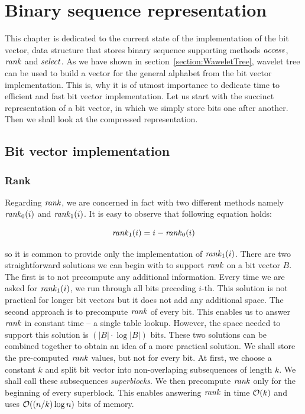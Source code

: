 \chapter{Binary sequence representation}
\label{kap:kap2}

This chapter is dedicated to the current state of the implementation of the bit vector, data
structure that stores binary sequence supporting methods $\mathit{access}$, $\mathit{rank}$ and $\mathit{select}$. As we have
shown in section~\ref{section:WaweletTree}, wavelet tree can be used to build a vector
for the general alphabet from the bit vector implementation. This is, why it is of utmost
importance to dedicate time to efficient and fast bit vector implementation. Let us start with
the succinct representation of a bit vector, in which we simply store bits one after another.
Then we shall look at the compressed representation.

\section{Bit vector implementation}

\subsection{Rank}
\label{section:rank}

Regarding $\mathit{rank}$, we are concerned in fact with two different methods namely $\mathit{rank}_0(i)$ and
$\mathit{rank}_1(i)$. It is easy to observe that following equation holds:

                    $$\mathit{rank}_1(i) = i - \mathit{rank}_0(i)$$

so it is common to provide only the implementation of $\mathit{rank}_1(i)$.
There are two straightforward solutions we can begin with to support $\mathit{rank}$ on a bit vector
$B$. The first is to not precompute any additional information. Every time we are asked
for $\mathit{rank}_1(i)$, we run through all bits preceding $i$-th. This solution is not
practical for longer bit vectors but it does not add any additional space. The second
approach is to precompute $\mathit{rank}$ of every bit. This enables us to answer $\mathit{rank}$ in constant
time -- a single table lookup. However, the space needed to support this
solution is $(|B|\cdot\log |B|)$ bits. These two solutions can be combined together to obtain an
idea of a more practical solution. We shall store the pre-computed $\mathit{rank}$ values, but not for every
bit. At first, we choose a constant $k$ and split bit vector into non-overlaping subsequences
of length $k$. We shall call these subsequences \textit{superblocks}. We then precompute $\mathit{rank}$
only for the beginning of every superblock. This enables answering $\mathit{rank}$ in time $\mathcal{O}(k)$ and
uses $\mathcal{O}((n/k)\log n)$ bits of memory.

